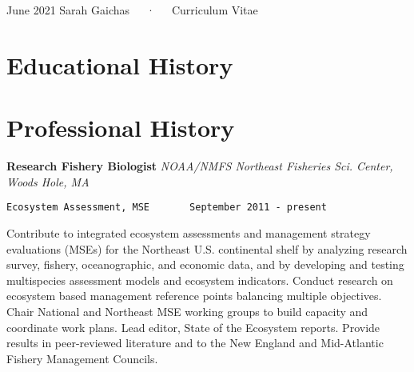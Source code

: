 \documentclass[11pt, a4paper]{awesome-cv}
\begin{document}
\makecvheader

\makecvfooter
  {June 2021}
    {Sarah Gaichas~~~·~~~Curriculum Vitae}
  {\thepage}





\hypertarget{educational-history}{%
\section{Educational History}\label{educational-history}}

\begin{cventries}
    \vspace{-4.0mm}
    \vspace{-4.0mm}
    \vspace{-4.0mm}
\end{cventries}

\hypertarget{professional-history}{%
\section{Professional History}\label{professional-history}}

\textbf{Research Fishery Biologist} \emph{NOAA/NMFS Northeast Fisheries
Sci. Center, Woods Hole, MA}

\begin{verbatim}
Ecosystem Assessment, MSE       September 2011 - present
\end{verbatim}

Contribute to integrated ecosystem assessments and management strategy
evaluations (MSEs) for the Northeast U.S. continental shelf by analyzing
research survey, fishery, oceanographic, and economic data, and by
developing and testing multispecies assessment models and ecosystem
indicators. Conduct research on ecosystem based management reference
points balancing multiple objectives. Chair National and Northeast MSE
working groups to build capacity and coordinate work plans. Lead editor,
State of the Ecosystem reports. Provide results in peer-reviewed
literature and to the New England and Mid-Atlantic Fishery Management
Councils.
\end{document}

